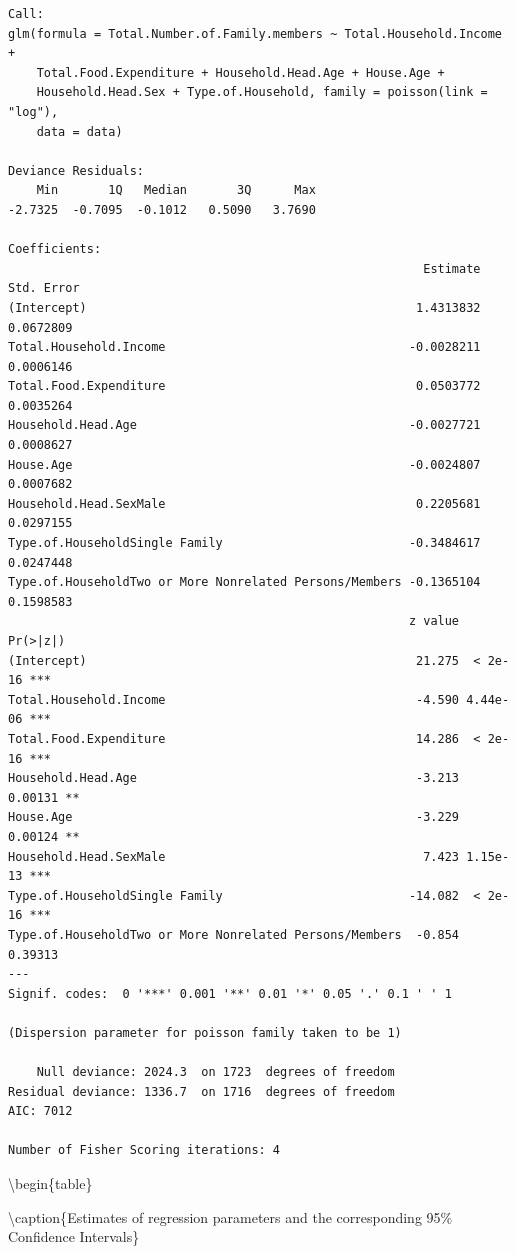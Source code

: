 \documentclass[
]{article}
\begin{document}
\begin{verbatim}
Call:
glm(formula = Total.Number.of.Family.members ~ Total.Household.Income + 
    Total.Food.Expenditure + Household.Head.Age + House.Age + 
    Household.Head.Sex + Type.of.Household, family = poisson(link = "log"), 
    data = data)

Deviance Residuals: 
    Min       1Q   Median       3Q      Max  
-2.7325  -0.7095  -0.1012   0.5090   3.7690  

Coefficients:
                                                          Estimate Std. Error
(Intercept)                                              1.4313832  0.0672809
Total.Household.Income                                  -0.0028211  0.0006146
Total.Food.Expenditure                                   0.0503772  0.0035264
Household.Head.Age                                      -0.0027721  0.0008627
House.Age                                               -0.0024807  0.0007682
Household.Head.SexMale                                   0.2205681  0.0297155
Type.of.HouseholdSingle Family                          -0.3484617  0.0247448
Type.of.HouseholdTwo or More Nonrelated Persons/Members -0.1365104  0.1598583
                                                        z value Pr(>|z|)    
(Intercept)                                              21.275  < 2e-16 ***
Total.Household.Income                                   -4.590 4.44e-06 ***
Total.Food.Expenditure                                   14.286  < 2e-16 ***
Household.Head.Age                                       -3.213  0.00131 ** 
House.Age                                                -3.229  0.00124 ** 
Household.Head.SexMale                                    7.423 1.15e-13 ***
Type.of.HouseholdSingle Family                          -14.082  < 2e-16 ***
Type.of.HouseholdTwo or More Nonrelated Persons/Members  -0.854  0.39313    
---
Signif. codes:  0 '***' 0.001 '**' 0.01 '*' 0.05 '.' 0.1 ' ' 1

(Dispersion parameter for poisson family taken to be 1)

    Null deviance: 2024.3  on 1723  degrees of freedom
Residual deviance: 1336.7  on 1716  degrees of freedom
AIC: 7012

Number of Fisher Scoring iterations: 4
\end{verbatim}

\textbackslash begin\{table\}

\textbackslash caption\{\label{tab:table of estimates and confidence intervals sig}Estimates
of regression parameters and the corresponding 95\% Confidence
Intervals\} \centering
\end{document}
